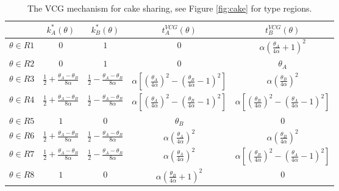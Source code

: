 \documentclass[a4paper]{article}
\begin{document}
\begin{enumerate}
		\begin{table}[h]
			\begin{center}
				\renewcommand{\arraystretch}{1.3}
				\begin{tabular}[center]{|| c | c c c c ||}
					\hline
					& $k^*_A(\theta)$ & $k^*_B(\theta)$ & $t^{VCG}_A(\theta)$ & $t^{VCG}_B(\theta)$
					\\
					\hline\hline 
					$\theta \in R1$ & $0$ & $1$ & $0$ & $\alpha \left(\frac{\theta_A}{4\alpha}+1\right)^2$
					\\
					\hline
					$\theta \in R2$ & $0$ & $1$ & $0$ & $\theta_A$
					\\
					\hline
					$\theta \in R3$ & $\frac{1}{2}+\frac{\theta_A-\theta_B}{8\alpha}$ & $\frac{1}{2}-\frac{\theta_A-\theta_B}{8\alpha}$ & $\alpha \left[ \left(\frac{\theta_A}{4\alpha}\right)^2 - \left(\frac{\theta_B}{4\alpha}-1\right)^2 \right]$ & $\alpha \left(\frac{\theta_B}{4\alpha}\right)^2$
					\\
					\hline
					$\theta \in R4$ & $\frac{1}{2}+\frac{\theta_A-\theta_B}{8\alpha}$ & $\frac{1}{2}-\frac{\theta_A-\theta_B}{8\alpha}$ & $\alpha \left[ \left(\frac{\theta_A}{4\alpha}\right)^2 - \left(\frac{\theta_B}{4\alpha}-1\right)^2 \right]$ & $\alpha \left[ \left(\frac{\theta_B}{4\alpha}\right)^2 - \left(\frac{\theta_A}{4\alpha}-1\right)^2 \right]$
					\\
					\hline
					$\theta \in R5$ & $1$ & $0$ & $\theta_B$ & $0$
					\\
					\hline
					$\theta \in R6$ & $\frac{1}{2}+\frac{\theta_A-\theta_B}{8\alpha}$ & $\frac{1}{2}-\frac{\theta_A-\theta_B}{8\alpha}$ & $\alpha \left(\frac{\theta_A}{4\alpha}\right)^2$ & $\alpha \left(\frac{\theta_B}{4\alpha}\right)^2$
					\\
					\hline
					$\theta \in R7$ & $\frac{1}{2}+\frac{\theta_A-\theta_B}{8\alpha}$ & $\frac{1}{2}-\frac{\theta_A-\theta_B}{8\alpha}$ & $\alpha \left(\frac{\theta_A}{4\alpha}\right)^2$ & $\alpha \left[ \left(\frac{\theta_B}{4\alpha}\right)^2 - \left(\frac{\theta_A}{4\alpha}-1\right)^2 \right]$
					\\
					\hline
					$\theta \in R8$ & $1$ & $0$ & $\alpha \left(\frac{\theta_B}{4\alpha}+1\right)^2$ & $0$
					\\
					\hline
				\end{tabular}
				\caption{The VCG mechanism for cake sharing, see Figure \ref{fig:cake} for type regions.}
				\label{table:cake}
			\end{center}
		\end{table}
		\begin{figure}[h]

\end{figure}
\end{enumerate}
\end{document}
